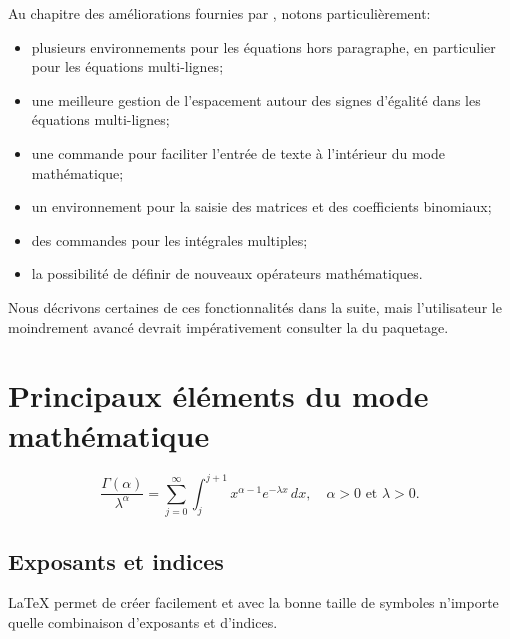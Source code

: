 Au chapitre des améliorations fournies par , notons
particulièrement:
\begin{itemize}
\item plusieurs environnements pour les équations hors paragraphe, en
  particulier pour les équations multi-lignes;
\item une meilleure gestion de l'espacement autour des signes
  d'égalité dans les équations multi-lignes;
\item une commande pour faciliter l'entrée de texte à l'intérieur du
  mode mathématique;
\item un environnement pour la saisie des matrices et des coefficients
  binomiaux;
\item des commandes pour les intégrales multiples;
\item la possibilité de définir de nouveaux opérateurs mathématiques.
\end{itemize}
Nous décrivons certaines de ces fonctionnalités dans la suite, mais
l'utilisateur le moindrement avancé devrait impérativement consulter
la %
du paquetage.


\section{Principaux éléments du mode mathématique}
\label{sec:math:bases}

\begin{equation*}
  \frac{\Gamma(\alpha)}{\lambda^\alpha} =
  \sum_{j = 0}^\infty \int_j^{j + 1} x^{\alpha - 1} e^{-\lambda x}\,
  dx,
  \quad
  \alpha > 0 \text{ et } \lambda > 0.
\end{equation*}

\subsection{Exposants et indices}
\label{sec:math:bases:exposants}

{\LaTeX} permet de créer facilement et avec la bonne taille de
symboles n'importe quelle combinaison d'exposants et d'indices.

